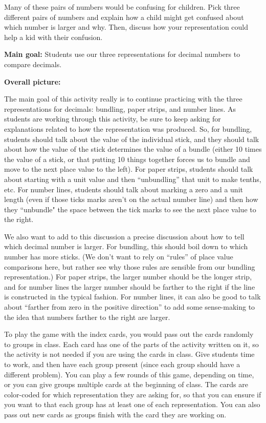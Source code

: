 \documentclass[nooutcomes,noauthor,handout]{ximera}
\begin{document}
\begin{problem}
Many of these pairs of numbers would be confusing for children. Pick three different pairs of numbers and explain how a child might get confused about which number is larger and why. Then, discuss how your representation could help a kid with their confusion.
\end{problem}

\newpage
\begin{instructorNotes}

{\bf Main goal:} Students use our three representations for decimal numbers to compare decimals.

{\bf Overall picture:}

The main goal of this activity really is to continue practicing with the three representations for decimals: bundling, paper strips, and number lines. As students are working through this activity, be sure to keep asking for explanations related to how the representation was produced. So, for bundling, students should talk about the value of the individual stick, and they should talk about how the value of the stick determines the value of a bundle (either 10 times the value of a stick, or that putting 10 things together forces us to bundle and move to the next place value to the left). For paper strips, students should talk about starting with a unit value and then ``unbundling'' that unit to make tenths, etc. For number lines, students should talk about marking a zero and a unit length (even if those ticks marks aren't on the actual number line) and then how they ``unbundle" the space between the tick marks to see the next place value to the right.

We also want to add to this discussion a precise discussion about how to tell which decimal number is larger. For bundling, this should boil down to which number has more sticks. (We don't want to rely on ``rules'' of place value comparisons here, but rather see why those rules are sensible from our bundling representation.) For paper strips, the larger number should be the longer strip, and for number lines the larger number should be farther to the right if the line is constructed in the typical fashion. For number lines, it can also be good to talk about ``farther from zero in the positive direction'' to add some sense-making to the idea that numbers farther to the right are larger.

To play the game with the index cards, you would pass out the cards randomly to groups in class. Each card has one of the parts of the activity written on it, so the activity is not needed if you are using the cards in class. Give students time to work, and then have each group present (since each group should have a different problem). You can play a few rounds of this game, depending on time, or you can give groups multiple cards at the beginning of class. The cards are color-coded for which representation they are asking for, so that you can ensure if you want to that each group has at least one of each representation. You can also pass out new cards as groups finish with the card they are working on.


\end{instructorNotes}
\end{document}

